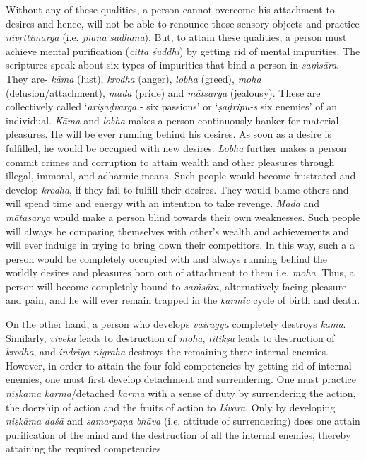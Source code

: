 Without any of these qualities, a person cannot overcome his attachment to desires and hence, will not be able to renounce those sensory objects and practice \emph{nivṛttimārga} (i.e. \emph{jñāna} \emph{sādhanā}). But, to attain these qualities, a person must achieve mental purification (\emph{citta} \emph{śuddhi}) by getting rid of mental impurities. The scriptures speak about six types of impurities that bind a person in \emph{saṁsāra}. They are- \emph{kāma} (lust), \emph{krodha} (anger), \emph{lobha} (greed), \emph{moha} (delusion/attachment), \emph{mada} (pride) and \emph{mātsarya} (jealousy). These are collectively called `\emph{ariṣaḍvarga} - six passions' or `\emph{ṣaḍripu-s} six enemies' of an individual. \emph{Kāma} and \emph{lobha} makes a person continuously hanker for material pleasures. He will be ever running behind his desires. As soon as a desire is fulfilled, he would be occupied with new desires. \emph{Lobha} further makes a person commit crimes and corruption to attain wealth and other pleasures through illegal, immoral, and adharmic means. Such people would become frustrated and develop \emph{krodha}, if they fail to fulfill their desires. They would blame others and will spend time and energy with an intention to take revenge. \emph{Mada} and \emph{mātasarya} would make a person blind towards their own weaknesses. Such people will always be comparing themselves with other's wealth and achievements and will ever indulge in trying to bring down their competitors. In this way, such a a person would be completely occupied with and always running behind the worldly desires and pleasures born out of attachment to them i.e. \emph{moha}. Thus, a person will become completely bound to \emph{saṁsāra}, alternatively facing pleasure and pain, and he will ever remain trapped in the \emph{karmic} cycle of birth and death.

On the other hand, a person who develops \emph{vairāgya} completely destroys \emph{kāma}. Similarly, \emph{viveka} leads to destruction of \emph{moha}, \emph{titikṣā} leads to destruction of \emph{krodha}, and \emph{indrīya nigraha} destroys the remaining three internal enemies. However, in order to attain the four-fold competencies by getting rid of internal enemies, one must first develop detachment and surrendering. One must practice \emph{niṣkāma} \emph{karma}/detached \emph{karma} with a sense of duty by surrendering the action, the doership of action and the fruits of action to \emph{Īśvara}. Only by developing \emph{niṣkāma} \emph{daśā} and \emph{samarpaṇa bhāva} (i.e. attitude of surrendering) does one attain purification of the mind and the destruction of all the internal enemies, thereby attaining the required competencies

